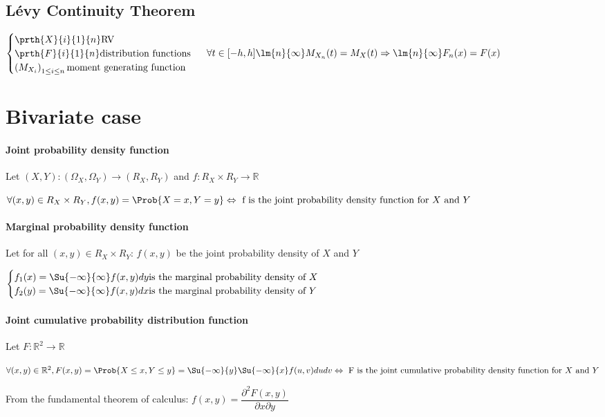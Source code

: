 \subsection{Lévy Continuity Theorem}
\begin{center}
	$
	\begin{cases}	
		\prth{X}{i}{1}{n}\text{RV}\\
		\prth{F}{i}{1}{n}\text{distribution functions}\\
		\left( M_{X_{i}} \right)_{1\leq i\leq n}\text{moment generating function}
	\end{cases}$
	$\forall t\in [-h,h]\lm{n}{\infty}M_{X_{n}}(t)=M_{X}(t)\Rightarrow
	\lm{n}{\infty}F_{n}(x)=F(x)
	$
\end{center}

\section{Bivariate case}
\paragraph{Joint probability density function}
Let $\left(X,Y\right):\left(\Omega_{X},\Omega_{Y}\right)\rightarrow\left(R_{X},R_{Y}\right)$ and $f:R_{X}\times R_{Y}\rightarrow \mathbb{R}$
\begin{center}
	$\forall (x,y)\in R_{X}\times R_{Y},f(x,y)=\Prob{X=x,Y=y}\Leftrightarrow\text{ f is the joint probability density function for }X\text{ and }Y$
\end{center}

\paragraph{Marginal probability density function}
Let for all $(x,y)\in R_{X}\times R_{Y}$: $f(x,y)$ be the joint probability density of $X$ and $Y$
\begin{center}
$\begin{cases}
	f_{1}(x)=\Su{{-\infty}}{\infty}f(x,y)dy\text{is the marginal probability density of }X\\
	f_{2}(y)=\Su{{-\infty}}{\infty}f(x,y)dx\text{is the marginal probability density of }Y
\end{cases}$
\end{center}
\paragraph{Joint cumulative probability distribution function}
Let $F:\mathbb{R}^{2}\rightarrow\mathbb{R}$
\begin{center}
	$\forall (x,y)\in \mathbb{R}^{2},F(x,y)=\Prob{X\leq x,Y\leq y}=\Su{ {-\infty}}{y}\Su{ {-\infty}}{x}f(u,v)dudv\Leftrightarrow\text{ F is the joint cumulative probability density function for }X\text{ and }Y$
\end{center}
From the fundamental theorem of calculus:
$f(x,y)=\dfrac{\partial^{2}F(x,y)}{\partial x\partial y}$


